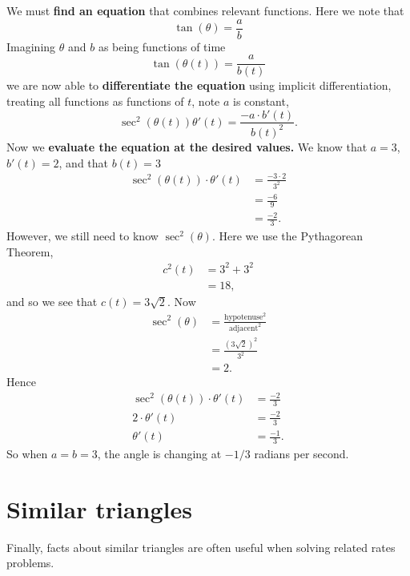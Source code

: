 \documentclass{ximera}
\begin{document}
\begin{example}
\begin{explanation}
    We must \textbf{find an equation} that combines relevant
    functions. Here we note that
    \[
    \tan(\theta) = \frac{a}{b}
    \]
    Imagining $\theta$ and $b$ as being functions of time
    \[
    \tan(\theta(t)) = \frac{a}{b(t)}
    \]
    we are now able to \textbf{differentiate the equation} using
    implicit differentiation, treating all functions as functions of
    $t$, note $a$ is constant,
    \[
    \sec^2(\theta(t))\theta'(t) = \frac{-a\cdot b'(t)}{b(t)^2}.
    \]
    Now we \textbf{evaluate the equation at the desired values.}  We
    know that $a=3$, $b'(t) = 2$, and that $b(t) = 3$
    \begin{align*}
    \sec^2(\theta(t))\cdot \theta'(t) &= \frac{-3\cdot 2}{3^2}\\
    &= \frac{-6}{9}\\
    &= \frac{-2}{3}.
    \end{align*}
    However, we still need to know $\sec^2(\theta)$. Here we use the
    Pythagorean Theorem,
    \begin{align*}
    c^2(t) &= 3^2 + 3^2\\
    &=18,
    \end{align*}
    and so we see that $c(t) = 3\sqrt{2}$. Now
    \begin{align*}
      \sec^2(\theta) &= \frac{\mathrm{hypotenuse}^2}{\mathrm{adjacent}^2}\\
      &= \frac{\left(3\sqrt{2}\right)^2}{3^2}\\
      &= 2.
    \end{align*}
    Hence
    \begin{align*}
      \sec^2(\theta(t))\cdot \theta'(t) &= \frac{-2}{3}\\
      2\cdot \theta'(t) &= \frac{-2}{3}\\
      \theta'(t) &= \frac{-1}{3}.
    \end{align*}
    So when $a=b=3$, the angle is changing at $-1/3$ radians per second.
  \end{explanation}
\end{example}



\section{Similar triangles}

Finally, facts about similar triangles are often useful when solving
related rates problems.
\end{document}
